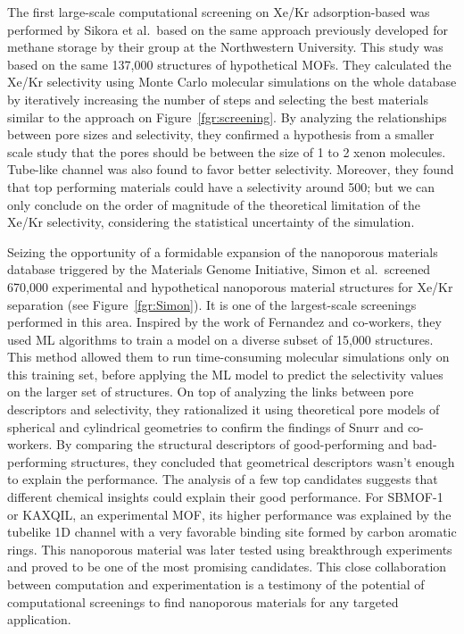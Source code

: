 \documentclass[main.tex]{subfiles}
\begin{document}
The first large-scale computational screening on Xe/Kr adsorption-based was performed by Sikora et al.\ based on the same approach previously developed for methane storage by their group at the Northwestern University.\autocite{Sikora_2012} This study was based on the same {137,000} structures of hypothetical MOFs.\autocite{Wilmer_2012} They calculated the Xe/Kr selectivity using Monte Carlo molecular simulations on the whole database by iteratively increasing the number of steps and selecting the best materials similar to the approach on Figure~\ref{fgr:screening}. By analyzing the relationships between pore sizes and selectivity, they confirmed a hypothesis from a smaller scale study that the pores should be between the size of 1 to 2 xenon molecules.\autocite{Ryan_2010} Tube-like channel was also found to favor better selectivity. Moreover, they found that top performing materials could have a selectivity around 500; but we can only conclude on the order of magnitude of the theoretical limitation of the Xe/Kr selectivity, considering the statistical uncertainty of the simulation.

Seizing the opportunity of a formidable expansion of the nanoporous materials database triggered by the Materials Genome Initiative, Simon et al.\ screened 670,000 experimental and hypothetical nanoporous material structures for Xe/Kr separation (see Figure~\ref{fgr:Simon}).\autocite{Simon_2015} It is one of the largest-scale screenings performed in this area. Inspired by the work of Fernandez and co-workers,\autocite{Fernandez_2013} they used ML algorithms to train a model on a diverse subset of 15,000 structures. This method allowed them to run time-consuming molecular simulations only on this training set, before applying the ML model to predict the selectivity values on the larger set of structures. On top of analyzing the links between pore descriptors and selectivity, they rationalized it using theoretical pore models of spherical and cylindrical geometries to confirm the findings of Snurr and co-workers.\autocite{Ryan_2010,Sikora_2012} By comparing the structural descriptors of good-performing and bad-performing structures, they concluded that geometrical descriptors wasn't enough to explain the performance. The analysis of a few top candidates suggests that different chemical insights could explain their good performance. For SBMOF-1 or KAXQIL,\autocite{KAXQIL} an experimental MOF, its higher performance was explained by the tubelike 1D channel with a very favorable binding site formed by carbon aromatic rings. This nanoporous material was later tested using breakthrough experiments and proved to be one of the most promising candidates.\autocite{Banerjee_2016} This close collaboration between computation and experimentation is a testimony of the potential of computational screenings to find nanoporous materials for any targeted application.
\end{document}

